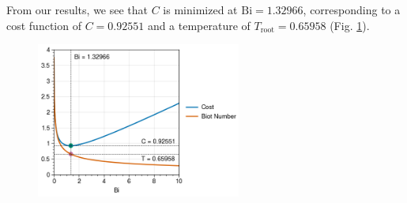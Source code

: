 \begin{enumerate}[label=(\alph*),leftmargin=*,itemsep=0mm]
    From our results, we see that $C$ is minimized at $\text{Bi} = 1.32966$, corresponding to a cost function of $C=0.92551$ and a temperature of $T_\text{root}=0.65958$ (Fig. \ref{prj2_qn2_pte}).

    \begin{figure}[h!]
    \centering
    \includegraphics[width=0.6\textwidth]{figures/prj2_qn2_pte.png}\\
    \caption{}
    \label{prj2_qn2_pte}
    \end{figure}
    
\end{enumerate}